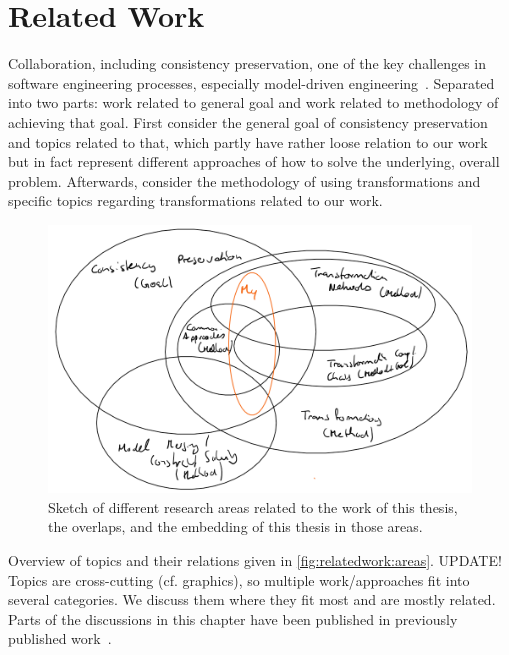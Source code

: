 \chapter{Related Work
}
\label{chap:relatedwork}

Collaboration, including consistency preservation, one of the key challenges in software engineering processes, especially model-driven engineering~\cite{franzago2018mdseChallenges-TSE}.
Separated into two parts: work related to general goal and work related to methodology of achieving that goal.
First consider the general goal of consistency preservation and topics related to that, which partly have rather loose relation to our work but in fact represent different approaches of how to solve the underlying, overall problem.
Afterwards, consider the methodology of using transformations and specific topics regarding transformations related to our work.

\begin{figure}
    \centering
    \includegraphics[width=\textwidth]{figures/epilogue/relatedwork/research_areas.png}
    \caption[Overlaps of related research areas]{Sketch of different research areas related to the work of this thesis, the overlaps, and the embedding of this thesis in those areas.}
    \label{fig:relatedwork:areas}
\end{figure}

Overview of topics and their relations given in \autoref{fig:relatedwork:areas}. UPDATE!
Topics are cross-cutting (cf. graphics), so multiple work/approaches fit into several categories. We discuss them where they fit most and are mostly related.
Parts of the discussions in this chapter have been published in previously published work~.



